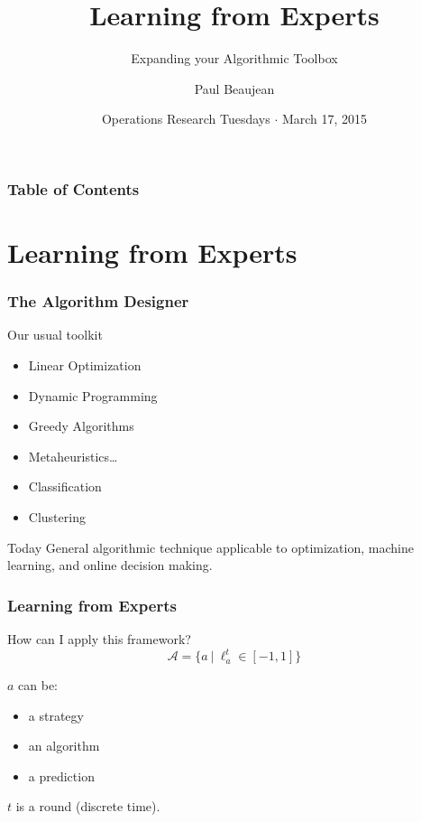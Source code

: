 \documentclass{beamer}
\title{Learning from Experts}
\subtitle{Expanding your Algorithmic Toolbox}
\date{Operations Research Tuesdays $\cdot$ March 17, 2015}
\author{Paul Beaujean\inst{\dag}}
\institute{\inst{\dag}IMT/OLN/NMP/TRM}
\begin{document}
\frame{\titlepage}

\begin{frame}
    \frametitle{Table of Contents}
    \tableofcontents{}
\end{frame}

\section{Learning from Experts}
\begin{frame}
    \frametitle{The Algorithm Designer}

    \begin{block}{Our usual toolkit}
        \begin{itemize}
            \item Linear Optimization
            \item Dynamic Programming
            \item Greedy Algorithms
            \item Metaheuristics\ldots
            \item Classification
            \item Clustering
        \end{itemize}
    \end{block}

    \begin{block}{Today}
        General algorithmic technique applicable to optimization, machine
        learning, and online decision making.
    \end{block}

\end{frame}

\begin{frame}
    \frametitle{Learning from Experts}

    \begin{block}{How can I apply this framework?}
        \begin{equation*}
            \mathcal{A} = \{ a~|~\ell_a^t \in [-1, 1]  \}
        \end{equation*}

        $a$ can be:
        \begin{itemize}
            \item a strategy
            \item an algorithm
            \item a prediction
        \end{itemize}

        $t$ is a round (discrete time).
    \end{block}

\end{frame}
\end{document}
